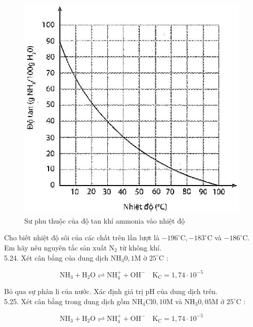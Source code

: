 \documentclass[10pt]{article}
\begin{document}
\begin{figure}[h]
\begin{center}
  \includegraphics[width=\textwidth]{2025_10_23_fa9073eecee116ad8cf2g-17}
\captionsetup{labelformat=empty}
\caption{Sư phu thuộc của độ tan khí ammonia vào nhiệt độ}
\end{center}
\end{figure}

Cho biết nhiệt độ sôi của các chất trên lần lượt là $-196^{\circ} \mathrm{C},-183^{\circ} \mathrm{C}$ và $-186^{\circ} \mathrm{C}$. Em hãy nêu nguyên tắc sản xuất $\mathrm{N}_{2}$ từ không khí.\\
5.24. Xét cân bằng của dung dịch $\mathrm{NH}_{3} 0,1 \mathrm{M}$ ờ $25^{\circ} \mathrm{C}$ :

$$
\mathrm{NH}_{3}+\mathrm{H}_{2} \mathrm{O} \rightleftharpoons \mathrm{NH}_{4}^{+}+\mathrm{OH}^{-} \quad \mathrm{K}_{\mathrm{C}}=1,74 \cdot 10^{-5}
$$

Bỏ qua sự phân li của nước. Xác định giá trị pH của dung dịch trên.\\
5.25. Xét cân bằng trong dung dịch gồm $\mathrm{NH}_{4} \mathrm{Cl} 0,10 \mathrm{M}$ và $\mathrm{NH}_{3} 0,05 \mathrm{M}$ ở $25^{\circ} \mathrm{C}$ :

$$
\mathrm{NH}_{3}+\mathrm{H}_{2} \mathrm{O} \rightleftharpoons \mathrm{NH}_{4}^{+}+\mathrm{OH}^{-} \quad \mathrm{K}_{\mathrm{C}}=1,74 \cdot 10^{-5}
$$
\end{document}
